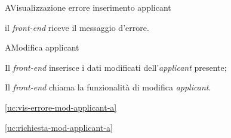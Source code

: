 \begin{usecase}{8}{A}{Visualizzazione errore inserimento applicant}



	\begin{ucscenarioprincipale}
		\item il \textit{front-end} riceve il messaggio d'errore.
	\end{ucscenarioprincipale}


	\label{uc:vis-errore-ins-applicant-a}
\end{usecase}

\begin{usecase}{9}{A}{Modifica applicant}



	\begin{ucscenarioprincipale}
		\item Il \textit{front-end} inserisce i dati modificati dell'\textit{applicant} presente;
		\item Il \textit{front-end} chiama la funzionalità di modifica \textit{applicant}.
	\end{ucscenarioprincipale}


	\begin{ucestensioni}
		\item \ref{uc:vis-errore-mod-applicant-a}
	\end{ucestensioni}

	\begin{ucgeneralizzazioni}
		\item \ref{uc:richiesta-mod-applicant-a}
	\end{ucgeneralizzazioni}

	\label{uc:mod-applicant-a}
\end{usecase}

